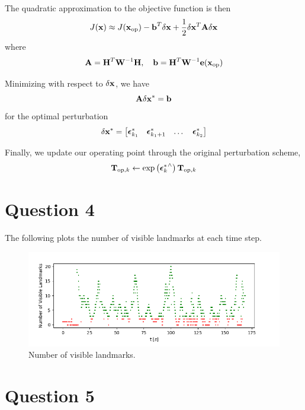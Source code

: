 \documentclass[a4paper]{article}
\begin{document}
The quadratic approximation to the objective function is then
\begin{equation}
    J(\bm{\mathbf{x}}) \approx J(\bm{\mathbf{x}}_{\text{op}}) - \bm{\mathbf{b}}^T \delta \bm{\mathbf{x}} + \dfrac{1}{2} \delta \bm{\mathbf{x}}^T \bm{\mathbf{A}} \delta \bm{\mathbf{x}}
\end{equation}
where
\begin{equation}
    \bm{\mathbf{A}} = \bm{\mathbf{H}}^T \bm{\mathbf{W}}^{-1}\bm{\mathbf{H}}, \quad \bm{\mathbf{b}} = \bm{\mathbf{H}}^T \bm{\mathbf{W}}^{-1} \bm{\mathbf{e}}(\bm{\mathbf{x}}_{\text{op}})
\end{equation}

Minimizing with respect to $\delta \bm{\mathbf{x}}$, we have 
\begin{equation}
    \bm{\mathbf{A}} \delta \bm{\mathbf{x}}^* = \bm{\mathbf{b}}
\end{equation}
for the optimal perturbation
\begin{equation}
    \delta \bm{\mathbf{x}}^* = \begin{bmatrix}
      \bm{\mathbf{\epsilon}}_{k_1}^* & \bm{\mathbf{\epsilon}}_{k_1+1}^* & \dots & \bm{\mathbf{\epsilon}}_{k_2}^*
    \end{bmatrix}
\end{equation}

Finally, we update our operating point through the original perturbation scheme,
\begin{equation}
    \bm{\mathbf{T}}_{\text{op}, k} \leftarrow \exp\left( {\bm{\mathbf{\epsilon}}_k^*}^{\wedge} \right) \bm{\mathbf{T}}_{\text{op}, k}
\end{equation}

\section*{Question 4}
The following plots the number of visible landmarks at each time step. 
\begin{figure}[H]
    \centering
    \includegraphics[width=\textwidth]{code/num_visible.png}
    \caption{Number of visible landmarks.}
    \label{fig:4}
\end{figure}

\section*{Question 5}
\end{document}
